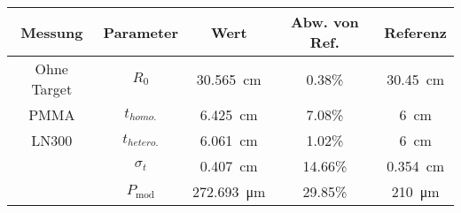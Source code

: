 \documentclass[a4paper,12pt]{report}
\begin{document}



\begin{tabular}{c|c|S|c|S}
    Messung & Parameter & {Wert} & Abw. von Ref. & {Referenz} \\
    \hline
    \hline
    Ohne Target & $R_0$ & \SI{30.565}{\centi\meter} & 0.38\% &  \SI{30.45}{\centi\meter}\\
    \hline
    PMMA & $t_{homo.}$ & \SI{6.425}{\centi\meter} & 7.08\% &  \SI{6}{\centi\meter}\\
    \hline
    LN300 & $t_{hetero.}$ & \SI{6.061}{\centi\meter} & 1.02\% &  \SI{6}{\centi\meter}\\
     & $\sigma_t$ & \SI{0.407}{\centi\meter} & 14.66\% & \SI{0.354}{\centi\meter} \\
     & $P_{\text{mod}}$ & \SI{272.693}{\micro\meter} & 29.85\% & \SI{210}{\micro\meter} \\
\end{tabular}
\end{document}
